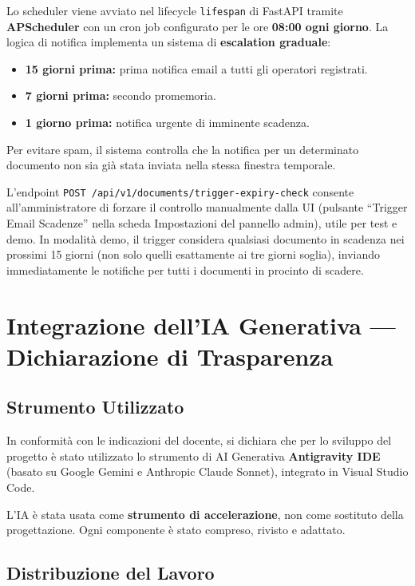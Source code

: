 \documentclass[12pt,a4paper,oneside]{report}
\begin{document}
Lo scheduler viene avviato nel lifecycle \texttt{lifespan} di FastAPI tramite
\textbf{APScheduler} con un cron job configurato per le ore \textbf{08:00 ogni giorno}.
La logica di notifica implementa un sistema di \textbf{escalation graduale}:
\begin{itemize}
    \item \textbf{15 giorni prima:} prima notifica email a tutti gli operatori registrati.
    \item \textbf{7 giorni prima:} secondo promemoria.
    \item \textbf{1 giorno prima:} notifica urgente di imminente scadenza.
\end{itemize}
Per evitare spam, il sistema controlla che la notifica per un determinato documento
non sia gi\`{a} stata inviata nella stessa finestra temporale.

L'endpoint \texttt{POST /api/v1/documents/trigger-expiry-check} consente
all'amministratore di forzare il controllo manualmente dalla UI (pulsante ``Trigger Email Scadenze''
nella scheda Impostazioni del pannello admin), utile per test e demo.
In modalit\`{a} demo, il trigger considera qualsiasi documento in scadenza
nei prossimi 15 giorni (non solo quelli esattamente ai tre giorni soglia),
inviando immediatamente le notifiche per tutti i documenti in procinto di scadere.

\chapter{Integrazione dell'IA Generativa --- Dichiarazione di Trasparenza}

\section{Strumento Utilizzato}

In conformit\`{a} con le indicazioni del docente, si dichiara che per lo sviluppo del
progetto \`{e} stato utilizzato lo strumento di AI Generativa \textbf{Antigravity IDE}
(basato su Google Gemini e Anthropic Claude Sonnet), integrato in Visual Studio Code.

L'IA \`{e} stata usata come \textbf{strumento di accelerazione}, non come sostituto
della progettazione. Ogni componente \`{e} stato compreso, rivisto e adattato.

\section{Distribuzione del Lavoro}
\end{document}
